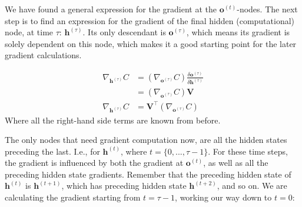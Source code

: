 \documentclass[12pt]{article}
\begin{document}
We have found a general expression for the gradient at the $\mathbf{o}^{(t)}$-nodes. The next step is to find an expression for the gradient of the final hidden (computational) node, at time $\tau$: $\mathbf{h}^{(\tau)}$. Its only descendant is $\mathbf{o}^{(\tau)}$, which means its gradient is solely dependent on this node, which makes it a good starting point for the later gradient calculations.

\begin{align}
    \nabla_{\mathbf{h}^{(\tau)}} C &= \left(\nabla_{\mathbf{o}^{(\tau)}}C\right) \frac{\delta \mathbf{o}^{(\tau)}}{\delta \mathbf{h}^{(\tau)}}\\
    &= \left(\nabla_{\mathbf{o}^{(\tau)}}C\right) \mathbf{V}\\
    \nabla_{\mathbf{h}^{(\tau)}} C &= \mathbf{V}^{\top} \left(\nabla_{\mathbf{o}^{(\tau)}}C\right)
\end{align}
Where all the right-hand side terms are known from before. \par

The only nodes that need gradient computation now, are all the hidden states preceding the last. I.e., for $\mathbf{h}^{(t)}$, where $t = \{0,...,\tau-1\}$. For these time steps, the gradient is influenced by both the gradient at $\mathbf{o}^{(t)}$, as well as all the preceding hidden state gradients. Remember that the preceding hidden state of $\mathbf{h}^{(t)}$ is $\mathbf{h}^{(t+1)}$, which has preceding hidden state $\mathbf{h}^{(t+2)}$, and so on. We are calculating the gradient starting from $t=\tau-1$, working our way down to $t=0$: \par
\end{document}
